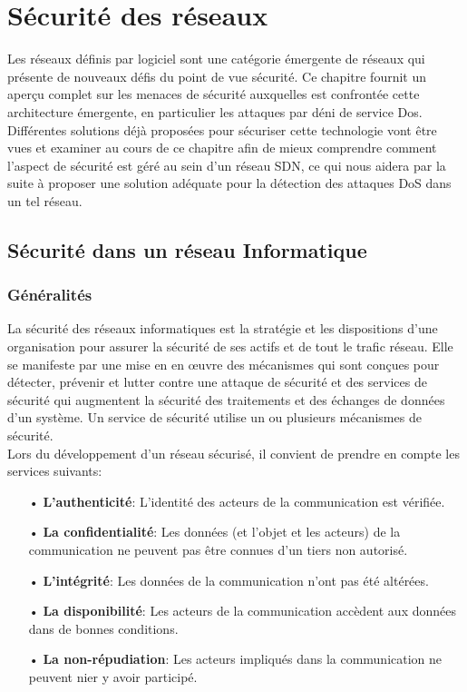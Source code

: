 \chapter{Sécurité des réseaux}

\label{Chapter2} 

Les réseaux définis par logiciel sont une catégorie émergente de réseaux qui présente de nouveaux défis du point de vue sécurité. Ce chapitre fournit un aperçu complet sur les menaces de sécurité auxquelles est confrontée cette architecture émergente, en particulier les attaques par déni de service Dos. Différentes solutions déjà proposées pour sécuriser cette technologie vont être vues et examiner au cours de ce chapitre afin de mieux comprendre comment l'aspect de sécurité est géré au sein d'un réseau SDN, ce qui nous aidera par la suite à proposer une solution adéquate pour la détection des attaques DoS dans un tel réseau.

\section{Sécurité dans un réseau Informatique}

\subsection{Généralités}
La sécurité des réseaux informatiques est la stratégie et les dispositions d’une organisation pour assurer la sécurité de ses actifs et de tout le trafic réseau. Elle se manifeste par une mise en en œuvre des mécanismes qui sont conçues pour détecter, prévenir et lutter contre une attaque de sécurité et des services de sécurité qui augmentent la sécurité des traitements et des échanges de données d’un système. Un service de sécurité utilise un ou plusieurs mécanismes de sécurité.\\

\noindent Lors du développement d’un réseau sécurisé, il convient de prendre en compte les services suivants:\\
\begin{itemize}
\item[•]\textbf{L’authenticité}: L’identité des acteurs de la communication est vérifiée.\\
\item[•]\textbf{La confidentialité}: Les données (et l'objet et les acteurs) de la communication ne peuvent pas être connues d’un tiers non autorisé.\\
\item[•]\textbf{L’intégrité}: Les données de la communication n’ont pas été altérées.\\
\item[•]\textbf{La disponibilité}: Les acteurs de la communication accèdent aux données dans de bonnes conditions.\\
\item[•]\textbf{La non-répudiation}: Les acteurs impliqués dans la communication ne peuvent nier y avoir participé.
\end{itemize}

